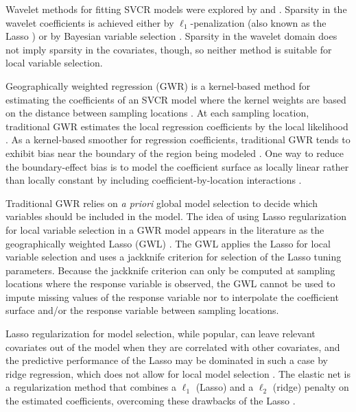 \documentclass[authoryear, review, 11pt]{elsarticle}
\begin{document}
	Wavelet methods for fitting SVCR models were explored by \cite{Shang-2011} and \cite{Zhang-2011}. Sparsity in the wavelet coefficients is achieved either by $\ell_1$-penalization (also known as the Lasso \citep{Tibshirani:1996}) \citep{Shang-2011} or by Bayesian variable selection \citep{Zhang-2011}. Sparsity in the wavelet domain does not imply sparsity in the covariates, though, so neither method is suitable for local variable selection.

	Geographically weighted regression (GWR) is a kernel-based method for estimating the coefficients of an SVCR model where the kernel weights are based on the distance between sampling locations \citep{Brundson:1998a, Fotheringham:2002}. At each sampling location, traditional GWR estimates the local regression coefficients by the local likelihood \citep{Loader:1999}. As a kernel-based smoother for regression coefficients, traditional GWR tends to exhibit bias near the boundary of the region being modeled \citep{Hastie:1993b}. One way to reduce the boundary-effect bias is to model the coefficient surface as locally linear rather than locally constant by including coefficient-by-location interactions \citep{Wang:2008b}.
	
	Traditional GWR relies on \emph{a priori} global model selection to decide which variables should be included in the model. The idea of using Lasso regularization for local variable selection in a GWR model appears in the literature as the geographically weighted Lasso (GWL) \citep{Wheeler:2009}. The GWL applies the Lasso for local variable selection and uses a jackknife criterion for selection of the Lasso tuning parameters. Because the jackknife criterion can only be computed at sampling locations where the response variable is observed, the GWL cannot be used to impute missing values of the response variable nor to interpolate the coefficient surface and/or the response variable between sampling locations.
	
	Lasso regularization for model selection, while popular, can leave relevant covariates out of the model when they are correlated with other covariates, and the predictive performance of the Lasso may be dominated in such a case by ridge regression, which does not allow for local model selection \citep{Tibshirani:1996}. The elastic net is a regularization method that combines a $\ell_1$ (Lasso) and a $\ell_2$ (ridge) penalty on the estimated coefficients, overcoming these drawbacks of the Lasso \citep{Zou:2005}.
	
\end{document}
